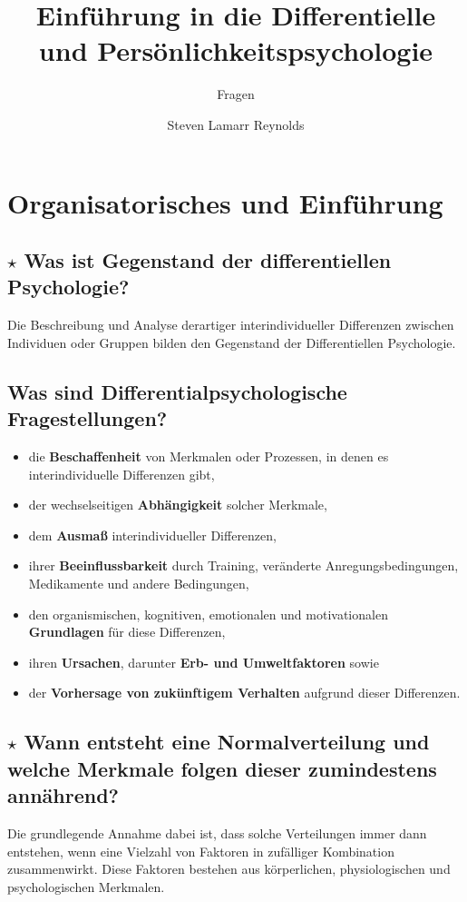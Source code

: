 \documentclass[a4paper,9pt,DIV=14]{scrartcl}
\begin{document}
\title{Einführung in die Differentielle und Persönlichkeitspsychologie}
\subtitle{Fragen}
\author{Steven Lamarr Reynolds}
\maketitle

\clearpage
\tableofcontents
\clearpage

\section{Organisatorisches und Einführung}

\subsection{$\star$ Was ist Gegenstand der differentiellen Psychologie?}%
    Die Beschreibung und Analyse derartiger interindividueller Differenzen zwischen Individuen oder Gruppen bilden den Gegenstand der Differentiellen Psychologie.
\subsection{Was sind Differentialpsychologische Fragestellungen?}
    \begin{itemize}\itemsep-0.5ex
        \item die \textbf{Beschaffenheit} von Merkmalen oder Prozessen, in denen es interindividuelle Differenzen gibt,
        \item der wechselseitigen \textbf{Abhängigkeit} solcher Merkmale,
        \item dem \textbf{Ausmaß} interindividueller Differenzen,
        \item ihrer \textbf{Beeinflussbarkeit} durch Training, veränderte Anregungsbedingungen, Medikamente und andere Bedingungen,
        \item den organismischen, kognitiven, emotionalen und motivationalen \textbf{Grundlagen} für diese Differenzen,
        \item ihren \textbf{Ursachen}, darunter \textbf{Erb- und Umweltfaktoren} sowie
        \item der \textbf{Vorhersage von zukünftigem Verhalten} aufgrund dieser Differenzen.
    \end{itemize}
\subsection{$\star$ Wann entsteht eine Normalverteilung und welche Merkmale folgen dieser zumindestens annährend?} %
    Die grundlegende Annahme dabei ist, dass solche Verteilungen immer dann entstehen, wenn eine Vielzahl von Faktoren in zufälliger Kombination zusammenwirkt. Diese Faktoren bestehen aus körperlichen, physiologischen und psychologischen Merkmalen.
\end{document}
